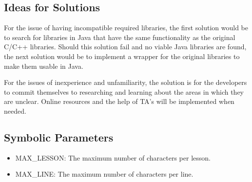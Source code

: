 \documentclass[12pt, titlepage]{article}
\begin{document}
\subsection{Ideas for Solutions}
\indent \indent For the issue of having incompatible required libraries, the first solution would be to search for libraries in Java that have the same functionality as the original C/C++ libraries. Should this solution fail and no viable Java libraries are found, the next solution would be to implement a wrapper for the original libraries to make them usable in Java.

\indent For the issues of inexperience and unfamiliarity, the solution is for the developers to commit themselves to researching and learning about the areas in which they are unclear. Online resources and the help of TA's will be implemented when needed.

\newpage

\subsection{Symbolic Parameters} \label{symbols}

\begin{itemize}
\item MAX\_LESSON: The maximum number of characters per lesson.
\item MAX\_LINE: The maximum number of characters per line.
\end{itemize}
\end{document}
